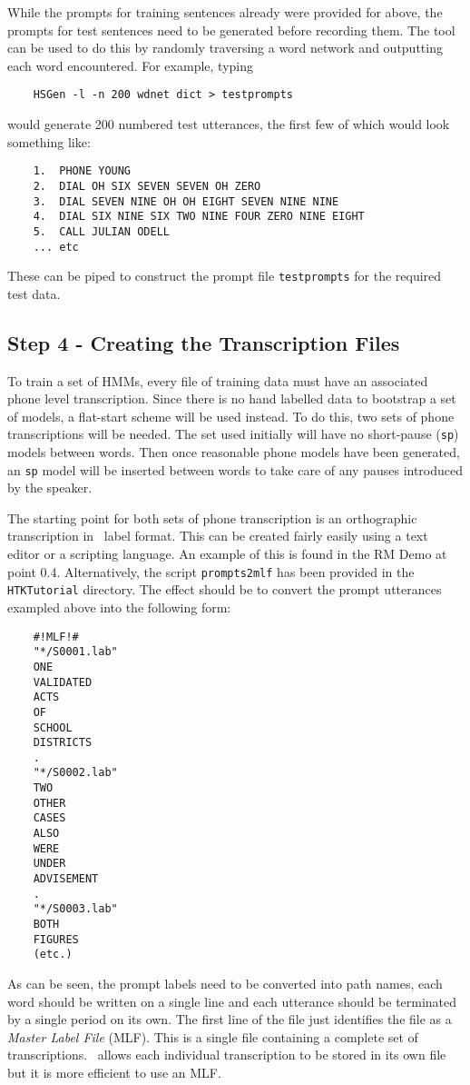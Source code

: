 While the prompts for training sentences already were provided for above, the
prompts for test sentences need to be generated before recording them. 
The tool
 can be used to do this by randomly traversing a word network and 
outputting each word encountered. For example, typing
\begin{verbatim}
    HSGen -l -n 200 wdnet dict > testprompts
\end{verbatim}
would generate 200 numbered test utterances, the first few of which would look something like:
\begin{verbatim}
    1.  PHONE YOUNG  
    2.  DIAL OH SIX SEVEN SEVEN OH ZERO
    3.  DIAL SEVEN NINE OH OH EIGHT SEVEN NINE NINE
    4.  DIAL SIX NINE SIX TWO NINE FOUR ZERO NINE EIGHT  
    5.  CALL JULIAN ODELL
    ... etc
\end{verbatim}
These can be piped to construct the prompt file \texttt{testprompts} for
the required test data.

\subsection{Step 4 - Creating the Transcription Files}

To train a set of HMMs, every file of training data must have an associated
phone level transcription.  Since there is no hand labelled data to bootstrap a
set of models, a flat-start scheme will be used instead.  To do this, two sets
of phone transcriptions will be needed.  The set used initially will have no
short-pause (\texttt{sp}) models between words.  Then once reasonable phone
models have been generated, an \texttt{sp} model will be inserted between words
to take care of any pauses introduced by the speaker.

The starting point for both sets of phone transcription is an
orthographic transcription in \HTK\ label
format.  This can be created fairly easily using a text editor or a scripting
language.
An example of this is found in the RM Demo at point 0.4. Alternatively, the
script \texttt{prompts2mlf} has been provided in the \texttt{HTKTutorial}
directory.
The effect should be to convert the prompt utterances exampled above into the
following form:
\begin{verbatim}
    #!MLF!#
    "*/S0001.lab"
    ONE 
    VALIDATED 
    ACTS 
    OF 
    SCHOOL 
    DISTRICTS
    .
    "*/S0002.lab"
    TWO 
    OTHER 
    CASES 
    ALSO 
    WERE 
    UNDER 
    ADVISEMENT
    .
    "*/S0003.lab" 
    BOTH 
    FIGURES 
    (etc.)
\end{verbatim}
As can be seen, the prompt labels need to be converted into path names, each
word should be written on a single line and each utterance should be terminated
by a single period on its own.  The first line of the file just identifies the
file as a \textit{Master Label File} (MLF).  This is a single file containing a
complete set of transcriptions.  \HTK\ allows each individual transcription to
be stored in its own file but it is more efficient to use an MLF.

